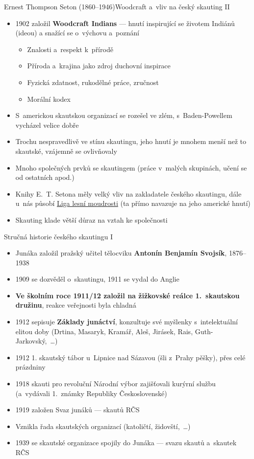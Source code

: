 \documentclass[compress, ucs, xelatex, xcolor=dvipsnames, print,
  hyperref={
    bookmarks=true,
    unicode=true,
    colorlinks=true,
    plainpages=false,
    pdfkeywords={Junak, Pedagogika, Skaut, Skauting, Vychovna metoda},
    linkcolor=Black,
    anchorcolor=Black,
    citecolor=OliveGreen,
    filecolor=OliveGreen,
    menucolor=Black,
    urlcolor=OliveGreen,
    pdftex}
  ]{beamer}
\begin{document}
\begin{frame}{Ernest Thompson Seton (1860--1946)}{Woodcraft a~vliv na český skauting II}
  \begin{itemize}
    \item 1902 založil \textbf{Woodcraft Indians} --- hnutí inspirující se životem Indiánů (ideou) a snažící se o~výchovu a~poznání
    \begin{itemize}
      \item Znalosti a~respekt k~přírodě
      \item Příroda a~krajina jako zdroj duchovní inspirace
      \item Fyzická zdatnost, rukodělné práce, zručnost
      \item Morální kodex
    \end{itemize}
    \item S~americkou skautskou organizací se rozešel ve zlém, s~Baden-Powellem vycházel velice dobře
    \item Trochu nespravedlivě ve stínu skautingu, jeho hnutí je mnohem menší než to skautské, vzájemně se ovlivňovaly
    \item Mnoho společných prvků se skautingem (práce v~malých skupinách, učení se od ostatních apod.)
    \item Knihy E.~T. Setona měly velký vliv na zakladatele českého skautingu, dále u~nás působí \href{https://www.woodcraft.cz/}{Liga lesní moudrosti} (ta přímo navazuje na jeho americké hnutí)
    \item Skauting klade větší důraz na vztah ke společnosti
  \end{itemize}
\end{frame}

\begin{frame}{Stručná historie českého skautingu I}
  \begin{itemize}
    \item Junáka založil pražský učitel tělocviku \textbf{Antonín Benjamín Svojsík}, 1876--1938
    \item 1909 se dozvěděl o~skautingu, 1911 se vydal do Anglie
    \item \textbf{Ve školním roce 1911/12 založil na žižkovské reálce 1.~skautskou družinu}, reakce veřejnosti byla chladná
    \item 1912 sepisuje \textbf{Základy junáctví}, konzultuje své myšlenky s~intelektuální elitou doby (Drtina, Masaryk, Kramář, Aleš, Jirásek, Rais, Guth-Jarkovský,~\ldots)
    \item 1912 1. skautský tábor u~Lipnice nad Sázavou (šli z~Prahy pěšky), přes celé prázdniny
    \item 1918 skauti pro revoluční Národní výbor zajišťovali kurýrní službu (a~vydávali 1.~známky Republiky Československé)
    \item 1919 založen Svaz junáků --- skautů RČS
    \item Vznikla řada skautských organizací (katoličtí, židovští,~\ldots)
    \item 1939 se skautské organizace spojily do Junáka --- svazu skautů a~skautek RČS
  \end{itemize}
\end{frame}
\end{document}
